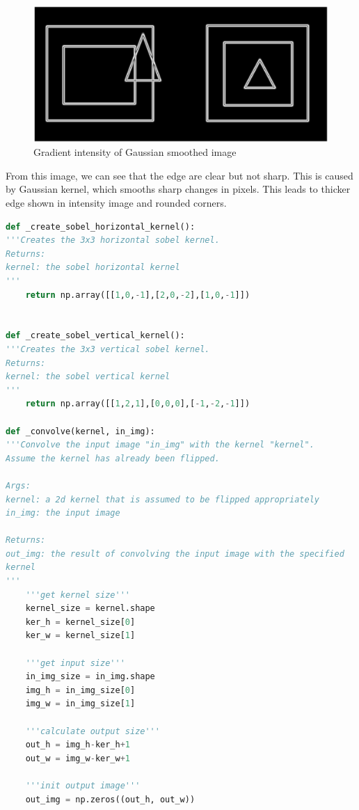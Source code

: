 \documentclass[12pt]{article}
\begin{document}
\begin{enumerate}
\begin{enumerate}
		\begin{figure}[H]
			\centering
			\includegraphics[width=\textwidth]{q4a.eps}
			\vspace{-4em}
			\caption{Gradient intensity of Gaussian smoothed image}\label{fig: q4a}
		\end{figure}
	From this image, we can see that the edge are clear but not sharp. This is caused by Gaussian kernel, which smooths sharp changes in pixels. This leads to thicker edge shown in intensity image and rounded corners.\\
	
\begin{lstlisting}[language=Python]
def _create_sobel_horizontal_kernel():
'''Creates the 3x3 horizontal sobel kernel.
Returns:
kernel: the sobel horizontal kernel
'''
	return np.array([[1,0,-1],[2,0,-2],[1,0,-1]])


def _create_sobel_vertical_kernel():
'''Creates the 3x3 vertical sobel kernel.
Returns:
kernel: the sobel vertical kernel
'''
	return np.array([[1,2,1],[0,0,0],[-1,-2,-1]])
	
def _convolve(kernel, in_img):
'''Convolve the input image "in_img" with the kernel "kernel".
Assume the kernel has already been flipped.

Args:
kernel: a 2d kernel that is assumed to be flipped appropriately
in_img: the input image

Returns:
out_img: the result of convolving the input image with the specified
kernel
'''
	'''get kernel size'''
	kernel_size = kernel.shape
	ker_h = kernel_size[0]
	ker_w = kernel_size[1]
	
	'''get input size'''
	in_img_size = in_img.shape
	img_h = in_img_size[0]
	img_w = in_img_size[1]
	
	'''calculate output size'''
	out_h = img_h-ker_h+1
	out_w = img_w-ker_w+1
	
	'''init output image'''
	out_img = np.zeros((out_h, out_w))
	

\end{lstlisting}
\end{enumerate}
\end{enumerate}
\end{document}
